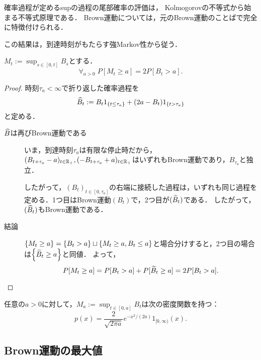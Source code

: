 \documentclass[uplatex,dvipdfmx]{jsreport}
\begin{document}
\begin{tcolorbox}[colframe=ForestGreen, colback=ForestGreen!10!white,breakable,colbacktitle=ForestGreen!40!white,coltitle=black,fonttitle=\bfseries\sffamily,
title=]
    確率過程が定めるsupの過程の尾部確率の評価は，
    Kolmogorovの不等式から始まる不等式原理である．
    Brown運動については，元のBrown運動のことばで完全に特徴付けられる．

    この結果は，到達時刻がもたらす強Markov性から従う．
\end{tcolorbox}

\begin{theorem}
    $M_t:=\sup_{s\in[0,t]}B_s$とする．
    \[\forall_{a>0}\;P[M_t\ge a]=2P[B_t>a].\]
\end{theorem}
\begin{proof}
    時刻$\tau_a<\infty$で折り返した確率過程を
    \[\widehat{B}_t:=B_t1_{\left\{t\le\tau_a\right\}}+(2a-B_t)1_{\left\{t>\tau_a\right\}}\]
    と定める．
    \begin{description}
        \item[$\widehat{B}$は再びBrown運動である] いま，到達時刻$\tau_a$は有限な停止時だから，$(B_{t+\tau_a}-a)_{t\in\mathbb{R}_+},(-B_{t+\tau_a}+a)_{t\in\mathbb{R}_+}$はいずれもBrown運動であり，$B_{\tau_a}$と独立．
        
        したがって，$(B_t)_{t\in[0,\tau_a]}$の右端に接続した過程は，いずれも同じ過程を定める．1つ目はBrown運動$(B_t)$で，2つ目が$(\widetilde{B}_t)$である．
        したがって，$(\widehat{B}_t)$もBrown運動である．
        \item[結論]
        $\{M_t\ge a\}=\left\{B_t>a\right\}\sqcup\left\{M_t\ge a,B_t\le a\right\}$と場合分けすると，2つ目の場合は$\left\{\widetilde{B}_t\ge a\right\}$と同値．
        よって，
        \[P[M_t\ge a]=P[B_t>a]+P[\widetilde{B}_t\ge a]=2P[B_t>a].\]
    \end{description}
\end{proof}

\begin{corollary}\label{cor-density-of-sup-process-of-Brownian-motion}
    任意の$a>0$に対して，$M_a:=\sup_{t\in[0,a]}B_t$は次の密度関数を持つ：
    \[p(x)=\frac{2}{\sqrt{2\pi a}}e^{-x^2/(2a)}1_{[0,\infty)}(x).\]
\end{corollary}

\subsection{Brown運動の最大値}
\end{document}
